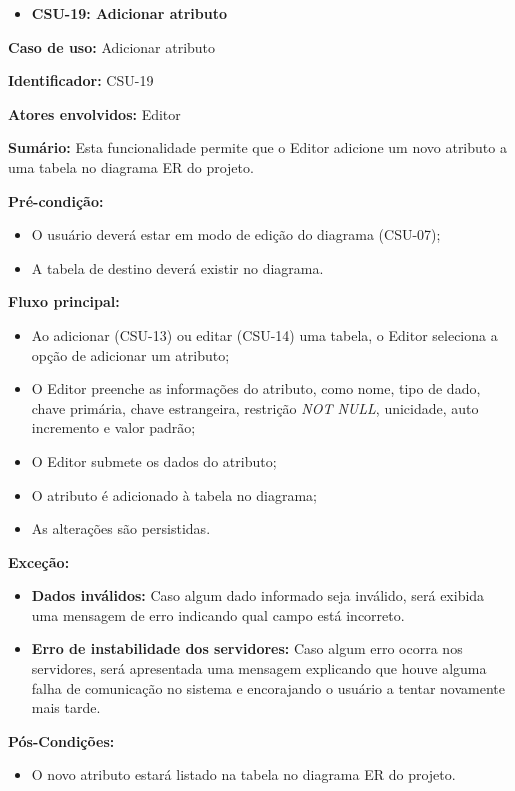 \vspace{1em}

\begin{itemize}
    \item \textbf{CSU-19: Adicionar atributo}
\end{itemize}

\textbf{Caso de uso:} Adicionar atributo

\textbf{Identificador:} CSU-19

\textbf{Atores envolvidos:} Editor

\textbf{Sumário:} Esta funcionalidade permite que o Editor adicione um novo atributo a uma tabela no diagrama ER do projeto.

\textbf{Pré-condição:}
\begin{itemize}
    \item O usuário deverá estar em modo de edição do diagrama (CSU-07);
    \item A tabela de destino deverá existir no diagrama.
\end{itemize}

\textbf{Fluxo principal:}
\begin{itemize}
    \item Ao adicionar (CSU-13) ou editar (CSU-14) uma tabela, o Editor seleciona a opção de adicionar um atributo;
    \item O Editor preenche as informações do atributo, como nome, tipo de dado, chave primária, chave estrangeira, restrição \textit{NOT NULL}, unicidade, auto incremento e valor padrão;
    \item O Editor submete os dados do atributo;
    \item O atributo é adicionado à tabela no diagrama;
    \item As alterações são persistidas.
\end{itemize}

\textbf{Exceção:}
\begin{itemize}
    \item \textbf{Dados inválidos:} Caso algum dado informado seja inválido, será exibida uma mensagem de erro indicando qual campo está incorreto.
    \item \textbf{Erro de instabilidade dos servidores:} Caso algum erro ocorra nos servidores, será apresentada uma mensagem explicando que houve alguma falha de comunicação no sistema e encorajando o usuário a tentar novamente mais tarde.
\end{itemize}

\textbf{Pós-Condições:}
\begin{itemize}
    \item O novo atributo estará listado na tabela no diagrama ER do projeto.
\end{itemize}

